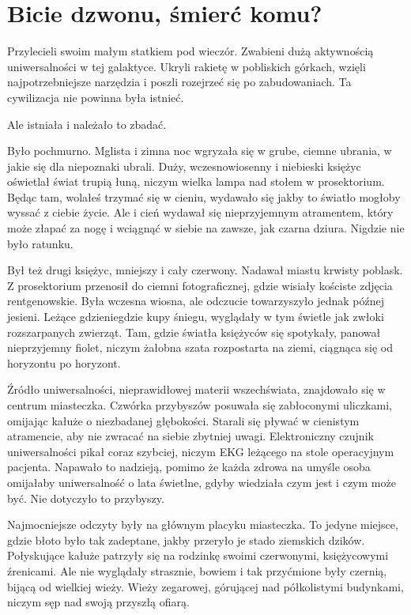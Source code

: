 \chapter{Bicie dzwonu, śmierć komu?}


Przylecieli swoim małym statkiem pod wieczór.
Zwabieni dużą aktywnością uniwersalności w tej galaktyce.
Ukryli rakietę w pobliskich górkach, wzięli najpotrzebniejsze narzędzia i poszli rozejrzeć się po zabudowaniach.
Ta cywilizacja nie powinna była istnieć.

Ale istniała i należało to zbadać.

Było pochmurno.
Mglista i zimna noc wgryzała się w grube, ciemne ubrania, w jakie się dla niepoznaki ubrali.
Duży, wczesnowiosenny i niebieski księżyc oświetlał świat trupią łuną, niczym wielka lampa nad stołem w prosektorium.
Będąc tam, wolałeś trzymać się w cieniu, wydawało się jakby to światło mogłoby wyssać z ciebie życie.
Ale i cień wydawał się nieprzyjemnym atramentem, który może złapać za nogę i wciągnąć w siebie na zawsze, jak czarna dziura. Nigdzie nie było ratunku.

Był też drugi księżyc, mniejszy i cały czerwony.
Nadawał miastu krwisty poblask. 
Z prosektorium przenosił do ciemni fotograficznej, gdzie wisiały kościste zdjęcia rentgenowskie.
Była wczesna wiosna, ale odczucie towarzyszyło jednak późnej jesieni.
Leżące gdzieniegdzie kupy śniegu, wyglądały w tym świetle jak zwłoki rozszarpanych zwierząt.
Tam, gdzie światła księżyców się spotykały, panował nieprzyjemny fiolet, niczym żałobna szata rozpostarta na ziemi, ciągnąca się od horyzontu po horyzont.

Źródło uniwersalności, nieprawidłowej materii wszechświata, znajdowało się w centrum miasteczka.
Czwórka przybyszów posuwała się zabłoconymi uliczkami, omijając kałuże o niezbadanej głębokości.
Starali się pływać w cienistym atramencie, aby nie zwracać na siebie zbytniej uwagi.
Elektroniczny czujnik uniwersalności pikał coraz szybciej, niczym EKG leżącego na stole operacyjnym pacjenta.
Napawało to nadzieją, pomimo że każda zdrowa na umyśle osoba omijałaby uniwersalność o lata świetlne, gdyby wiedziała czym jest i czym może być.
Nie dotyczyło to przybyszy.

Najmocniejsze odczyty były na głównym placyku miasteczka.
To jedyne miejsce, gdzie błoto było tak zadeptane, jakby przeryło je stado ziemskich dzików.
Połyskujące kałuże patrzyły się na rodzinkę swoimi czerwonymi, księżycowymi źrenicami.
Ale nie wyglądały strasznie, bowiem i tak przyćmione były czernią, bijącą od wielkiej wieży.
Wieży zegarowej, górującej nad półkolistymi budynkami, niczym sęp nad swoją przyszłą ofiarą.

